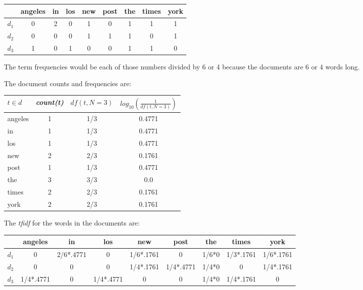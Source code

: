 \documentclass[10pt]{article}
\begin{document}
\begin{table}[H]
\begin{center}
\begin{tabular}{c|c|c|c|c|c|c|c|c}
 & angeles & in & los & new & post & the & times & york\\
\hline
$d_1$ & 0 & 2 & 0 & 1 & 0 & 1 & 1 & 1\\
$d_2$ & 0 & 0 & 0 & 1 & 1 & 1 & 0 & 1\\
$d_3$ & 1 & 0 & 1 & 0 & 0 & 1 & 1 & 0\\
\end{tabular}
\end{center}
\label{default}
\end{table}%

The term frequencies would be each of those numbers divided by 6 or 4 because the documents are 6 or 4 words long.

The document counts and frequencies are:

\begin{table}[H]
\begin{center}
\begin{tabular}{l|c|c|c}
$t \in d$ & {\em count(t)} & $df(t,N=3)$ & $log_{10}(\frac{1}{df(t,N=3)})$\\
\hline
angeles & 1 & 1/3 & 0.4771\\
in & 1 & 1/3 & 0.4771\\
 los & 1 & 1/3 & 0.4771\\
  new & 2& 2/3 & 0.1761\\
   post & 1& 1/3& 0.4771\\ 
the & 3 & 3/3 & 0.0\\
   times & 2& 2/3 & 0.1761\\
   york& 2& 2/3 & 0.1761\\
\end{tabular}
\end{center}
\label{default}
\end{table}%

The {\em tfidf} for the words in the documents are:

\begin{table}[H]
\begin{center}
\begin{footnotesize}
\begin{tabular}{c|c|c|c|c|c|c|c|c}
 & angeles & in & los & new & post & the & times & york\\
\hline
$d_1$ & 0 & 2/6*.4771 & 0 & 1/6*.1761 & 0 & 1/6*0 & 1/3*.1761 & 1/6*.1761\\
$d_2$ & 0 & 0 & 0 & 1/4*.1761 & 1/4*.4771 & 1/4*0 & 0 & 1/4*.1761\\
$d_3$ & 1/4*.4771 & 0 & 1/4*.4771 & 0 & 0 & 1/4*0 & 1/4*.1761 & 0\\
\end{tabular}
\end{footnotesize}
\end{center}
\end{table}%
\end{document}
